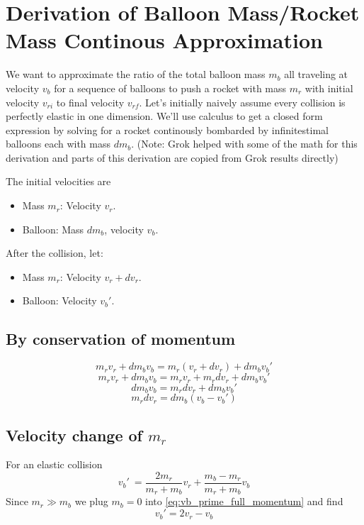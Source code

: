 \documentclass{article}
\begin{document}
\appendix 
\section{Derivation of Balloon Mass/Rocket Mass Continous Approximation}\label{sec:balloon_ratio_approximation}  We want to approximate the ratio of the total balloon mass \(m_b\) all traveling at velocity \(v_b\) for a sequence of balloons to push a rocket with mass \(m_r\) with initial velocity \(v_{ri}\) to final velocity \(v_{rf}\).   Let's initially naively assume every collision is perfectly elastic in one dimension.   We'll use calculus to get a  closed form expression by solving for a rocket  continously bombarded by infinitestimal balloons each with mass \(dm_b\).   (Note: Grok \cite{grok}  helped with some of the math for this derivation and parts of this derivation are copied from Grok  results directly)

The initial velocities are
\begin{itemize}
\item Mass \( m_r \): Velocity \( v_r \).
\item Balloon: Mass \( dm_b \), velocity \( v_b \).
\end{itemize}
After the collision, let:
\begin{itemize}
    \item Mass \( m_r \): Velocity \( v_r + dv_r \).
    \item Balloon: Velocity \( v_b' \).
\end{itemize}
\subsection{By conservation of momentum} \[
m_r v_r + dm_b v_b = m_r (v_r + dv_r) + dm_b v_b'
\]
\[
m_r v_r + dm_b v_b = m_r v_r + m_r dv_r + dm_b v_b'
\]
\[
dm_b v_b = m_r dv_r + dm_b v_b'
\]
\begin{equation}
m_r dv_r = dm_b (v_b - v_b') \label{eq:momentum}
\end{equation}

\subsection[Velocity change of rocket mass]{Velocity change of \(m_r\)}
For an elastic collision
\begin{equation}
    v_b'\ = \frac{2m_r}{m_r+m_b}v_r + \frac{m_b-m_r}{m_r+m_b}v_b \label{eq:vb_prime_full_momentum}
\end{equation}
Since \(m_r \gg m_b\)   we plug \(m_b = 0\)  into \autoref{eq:vb_prime_full_momentum} and find 
\begin{equation}
v_b' = 2v_r - v_b  \label{eq:vb_prime_result}
\end{equation}      
\end{document}
